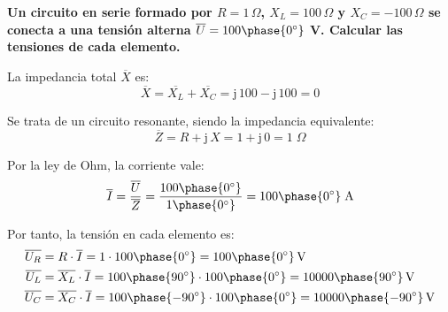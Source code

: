 \documentclass[11pt]{book} %
\begin{document}
	\vspace{4mm}
	\begin{example}\label{ej.2-4}
		\textbf{Un circuito en serie formado por $R=1\,\Omega$, ${X_L}=100\,\Omega$ y ${X_C}=-100\,\Omega$ se conecta a una tensión alterna $\overline{U}=100\phase{0^\circ}$ V. Calcular las tensiones de cada elemento.}
		
		La impedancia total $\overline{X}$ es:
		\begin{equation*}
			\overline{X}= \overline{X_L}+\overline{X_C}=\mathrm{j}\,100-\mathrm{j}\,100=0
		\end{equation*}
		
		Se trata de un circuito resonante, siendo la impedancia equivalente:
		\begin{equation*}
			\overline{Z}=R+\mathrm{j}\,X=1+\mathrm{j}\,0=1\;\Omega
		\end{equation*}
		
		Por la ley de Ohm, la corriente vale:
		\begin{equation*}
			\overline{I}=\dfrac{\overline{U}}{\overline{Z}}=\dfrac{100\phase{0^\circ}}{1\phase{0^\circ}}=100\phase{0^\circ}\;\text{A}
		\end{equation*}
		
		Por tanto, la tensión en cada elemento es: 
		\begin{align*}
			\overline{U_R}&=R\cdot\overline{I}=1\cdot 100\phase{0^\circ}=100\phase{0^\circ}\,\text{V}\\
			\overline{U_L}&=\overline{X_L}\cdot\overline{I}=100\phase{90^\circ}\cdot 100\phase{0^\circ}=10000\phase{90^\circ}\,\text{V}\\
			\overline{U_C}&=\overline{X_C}\cdot\overline{I}=100\phase{-90^\circ}\cdot 100\phase{0^\circ}=10000\phase{-90^\circ}\,\text{V}
		\end{align*}
	\end{example}
	
	
\end{document}
